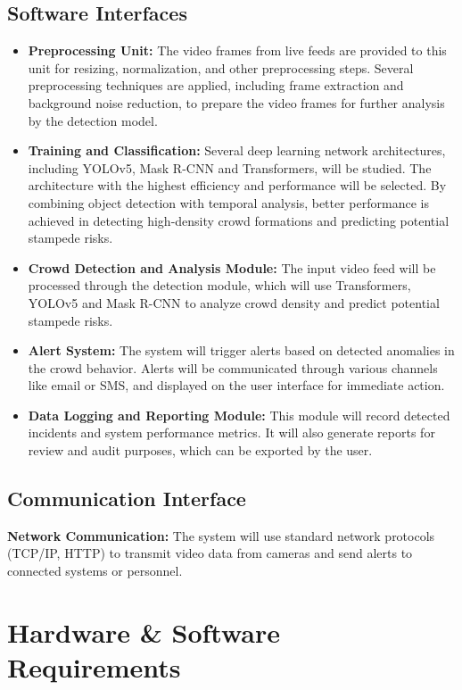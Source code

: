 \documentclass[11pt]{report}
\begin{document}
\subsection{Software Interfaces}
\begin{itemize}
    \item \textbf{Preprocessing Unit:} The video frames from live feeds are provided to this unit for resizing, normalization, and other preprocessing steps. Several preprocessing techniques are applied, including frame extraction and background noise reduction, to prepare the video frames for further analysis by the detection model.

    \item \textbf{Training and Classification:} Several deep learning network architectures, including YOLOv5, Mask R-CNN and Transformers, will be studied. The architecture with the highest efficiency and performance will be selected. By combining object detection with temporal analysis, better performance is achieved in detecting high-density crowd formations and predicting potential stampede risks.

    \item \textbf{Crowd Detection and Analysis Module:} The input video feed will be processed through the detection module, which will use Transformers, YOLOv5 and Mask R-CNN to analyze crowd density and predict potential stampede risks.
    
    \item \textbf{Alert System:} The system will trigger alerts based on detected anomalies in the crowd behavior. Alerts will be communicated through various channels like email or SMS, and displayed on the user interface for immediate action.
    
    \item \textbf{Data Logging and Reporting Module:} This module will record detected incidents and system performance metrics. It will also generate reports for review and audit purposes, which can be exported by the user.
\end{itemize}

\subsection{Communication Interface}
 \textbf{Network Communication:} The system will use standard network protocols (TCP/IP, HTTP) to transmit video data from cameras and send alerts to connected systems or personnel. 

\section{ Hardware \& Software Requirements}
\end{document}
